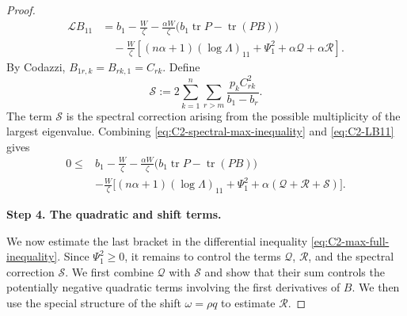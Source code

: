 \documentclass[11pt, reqno]{amsart}
\theoremstyle{remark}
\theoremstyle{definition}
\numberwithin{equation}{section}
\DeclareMathOperator{\tr}{tr}
\begin{document}
\begin{proof}
\begin{equation}
\begin{split}
        \mathcal L B_{11}
        &=b_1-\frac W\zeta
          -\frac{\alpha W}{\zeta}
             \bigl(b_1\tr P-\tr(PB)\bigr)\\
        &\quad
          -\frac W\zeta\left[
              (n\alpha+1)(\log \Lambda)_{11}
              +\Psi_1^2+\alpha\mathcal Q+\alpha\mathcal R
          \right].
\end{split}
\end{equation}
By Codazzi, $B_{1r,k}=B_{rk,1}=C_{rk}$.  Define
\begin{equation*}
        \mathcal{S}
        :=2\sum_{k=1}^n\sum_{r>m}
             \frac{p_k C_{rk}^2}{b_1-b_r}.
\end{equation*}
The term $\mathcal S$ is the spectral correction arising from the possible multiplicity of the largest eigenvalue. Combining \eqref{eq:C2-spectral-max-inequality} and
\eqref{eq:C2-LB11} gives
\begin{align}
        0\le &b_1-\frac W\zeta
          -\frac{\alpha W}{\zeta}
             \bigl(b_1\tr P-\tr(PB)\bigr)  \nonumber\\
        & -\frac W\zeta\bigg[
              (n\alpha+1)(\log\Lambda)_{11}
              +\Psi_1^2
              +\alpha(\mathcal Q+\mathcal R+\mathcal S)
          \bigg].\label{eq:C2-max-full-inequality}
\end{align}


\medskip
\noindent\textbf{Step 4. The quadratic and shift terms.}

We now estimate the last bracket in the differential inequality
\eqref{eq:C2-max-full-inequality}. Since $\Psi_1^2\geq0$, it remains to control the terms $\mathcal Q$, $\mathcal R$, and the spectral correction $\mathcal S$. We first combine
$\mathcal Q$ with $\mathcal S$ and show that their sum controls the potentially negative quadratic terms involving the first derivatives of $B$. We then use the special structure of the shift $\omega=\rho q$ to estimate $\mathcal R$.


\end{proof}
\end{document}
